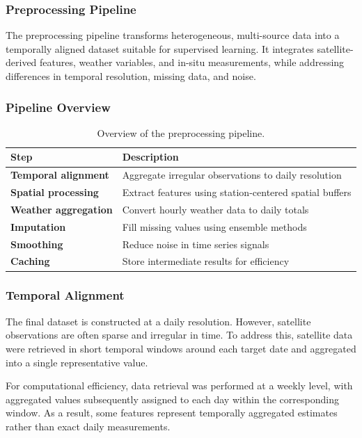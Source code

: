 \subsubsection*{Preprocessing Pipeline}

The preprocessing pipeline transforms heterogeneous, multi-source data into a temporally aligned dataset suitable for supervised learning. It integrates satellite-derived features, weather variables, and in-situ measurements, while addressing differences in temporal resolution, missing data, and noise.

\subsubsection*{Pipeline Overview}

\begin{table}[H]
\centering
\begin{tabular}{ll}
\toprule
\textbf{Step} & \textbf{Description} \\
\midrule
\textbf{Temporal alignment} & Aggregate irregular observations to daily resolution \\
\textbf{Spatial processing} & Extract features using station-centered spatial buffers \\
\textbf{Weather aggregation} & Convert hourly weather data to daily totals \\
\textbf{Imputation} & Fill missing values using ensemble methods \\
\textbf{Smoothing} & Reduce noise in time series signals \\
\textbf{Caching} & Store intermediate results for efficiency \\
\bottomrule
\end{tabular}
\caption{Overview of the preprocessing pipeline.}
\end{table}

\subsubsection*{Temporal Alignment}
The final dataset is constructed at a daily resolution. However, satellite observations are often sparse and irregular in time. To address this, satellite data were retrieved in short temporal windows around each target date and aggregated into a single representative value.

For computational efficiency, data retrieval was performed at a weekly level, with aggregated values subsequently assigned to each day within the corresponding window. As a result, some features represent temporally aggregated estimates rather than exact daily measurements.

